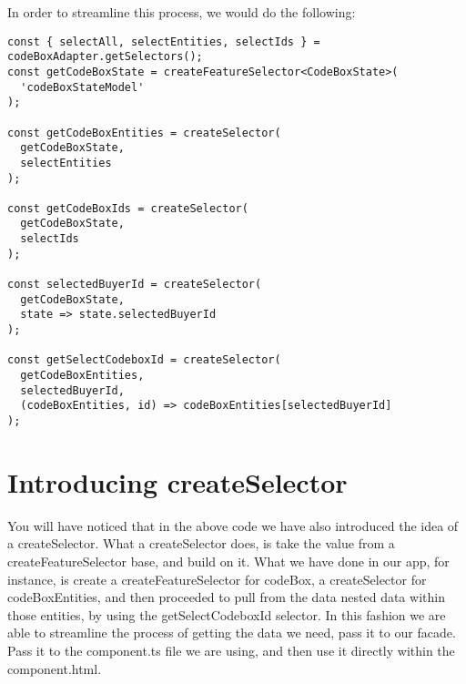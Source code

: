 In order to streamline this process, we would do the following:
\begin{lstlisting}
const { selectAll, selectEntities, selectIds } = codeBoxAdapter.getSelectors();
const getCodeBoxState = createFeatureSelector<CodeBoxState>(
  'codeBoxStateModel'
);

const getCodeBoxEntities = createSelector(
  getCodeBoxState,
  selectEntities
);

const getCodeBoxIds = createSelector(
  getCodeBoxState,
  selectIds
);

const selectedBuyerId = createSelector(
  getCodeBoxState,
  state => state.selectedBuyerId
);

const getSelectCodeboxId = createSelector(
  getCodeBoxEntities,
  selectedBuyerId,
  (codeBoxEntities, id) => codeBoxEntities[selectedBuyerId]
);
\end{lstlisting}


\section{Introducing createSelector}
You will have noticed that in the above code we have also introduced the idea
of a createSelector. What a createSelector does, is take the value from a
createFeatureSelector base, and build on it. What we have done in our app, for
instance, is create a createFeatureSelector for codeBox, a createSelector for
codeBoxEntities, and then proceeded to pull from the data nested data within
those entities, by using the getSelectCodeboxId selector. In this fashion we
are able to streamline the process of getting the data we need, pass it to our
facade. Pass it to the component.ts file we are using, and then use it directly
within the component.html.

